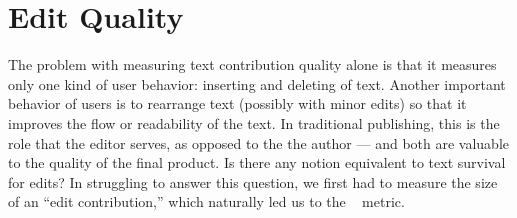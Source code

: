 \section{Edit Quality}
\label{sec:editquality}

The problem with measuring text contribution quality alone is that it
measures only one kind of user behavior: inserting and deleting of text.
Another important behavior of users is to rearrange text
(possibly with minor edits) so that it improves the flow or
readability of the text.
In traditional publishing, this is the role that the editor
serves, as opposed to the the author --- and both are valuable
to the quality of the final product.
Is there any notion equivalent to text survival for edits?
In struggling to answer this question, we first had to measure
the size of an ``edit contribution,'' which naturally led us to the
~\cite{Levenshtein66,TichyEditDist,Cormode2007,Adler2007}
metric.

